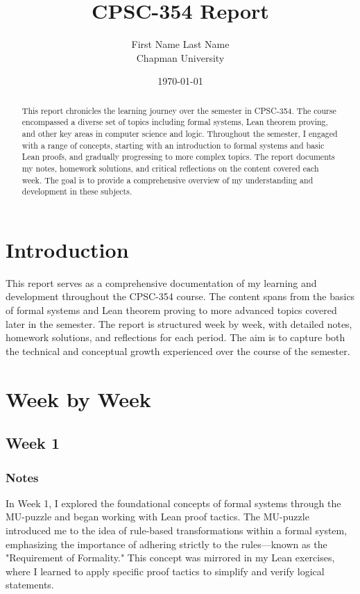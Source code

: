 \documentclass{article}
\title{CPSC-354 Report}
\author{First Name Last Name  \\ Chapman University}
\date{\today}
\theoremstyle{theorem}
\theoremstyle{definition}
\theoremstyle{remark}
\begin{document}
\maketitle

\begin{abstract}
This report chronicles the learning journey over the semester in CPSC-354. The course encompassed a diverse set of topics including formal systems, Lean theorem proving, and other key areas in computer science and logic. Throughout the semester, I engaged with a range of concepts, starting with an introduction to formal systems and basic Lean proofs, and gradually progressing to more complex topics. The report documents my notes, homework solutions, and critical reflections on the content covered each week. The goal is to provide a comprehensive overview of my understanding and development in these subjects.
\end{abstract}

\setcounter{tocdepth}{3}
\tableofcontents

\section{Introduction}\label{intro}

This report serves as a comprehensive documentation of my learning and development throughout the CPSC-354 course. The content spans from the basics of formal systems and Lean theorem proving to more advanced topics covered later in the semester. The report is structured week by week, with detailed notes, homework solutions, and reflections for each period. The aim is to capture both the technical and conceptual growth experienced over the course of the semester.

\section{Week by Week}\label{homework}

\subsection{Week 1}

\subsubsection*{Notes}

In Week 1, I explored the foundational concepts of formal systems through the MU-puzzle and began working with Lean proof tactics. The MU-puzzle introduced me to the idea of rule-based transformations within a formal system, emphasizing the importance of adhering strictly to the rules—known as the "Requirement of Formality." This concept was mirrored in my Lean exercises, where I learned to apply specific proof tactics to simplify and verify logical statements.
\end{document}
